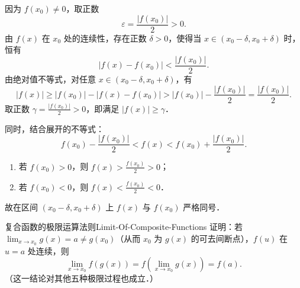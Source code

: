 \begin{myproof}
    因为 $f(x_0) \neq 0$，取正数
    \begin{equation}
        \varepsilon = \frac{|f(x_0)|}{2} > 0.
    \end{equation}
    由 $f(x)$ 在 $x_0$ 处的连续性，存在正数 $\delta > 0$，使得当 $x \in (x_0 - \delta, x_0 + \delta)$ 时，恒有
    \begin{equation}
        |f(x) - f(x_0)| < \frac{|f(x_0)|}{2}.
    \end{equation}
    由绝对值不等式，对任意 $x \in (x_0 - \delta, x_0 + \delta)$，有
    \begin{equation}
        |f(x)| \geqslant |f(x_0)| - |f(x) - f(x_0)| > |f(x_0)| - \frac{|f(x_0)|}{2} = \frac{|f(x_0)|}{2}.
    \end{equation}
    取正数 $\gamma = \frac{|f(x_0)|}{2} > 0$，即满足 $|f(x)| \geqslant \gamma$．

    同时，结合展开的不等式：
    \begin{equation}
        f(x_0) - \frac{|f(x_0)|}{2} < f(x) < f(x_0) + \frac{|f(x_0)|}{2}.
    \end{equation}
    \begin{enumerate}
        \item 若 $f(x_0) > 0$，则 $f(x) > \frac{f(x_0)}{2} > 0$；
        \item 若 $f(x_0) < 0$，则 $f(x) < \frac{f(x_0)}{2} < 0$．
    \end{enumerate}
    故在区间 $(x_0 - \delta, x_0 + \delta)$ 上 $f(x)$ 与 $f(x_0)$ 严格同号．
\end{myproof}

\begin{problem}{复合函数的极限运算法则}{Limit-Of-Composite-Functions}
    证明：若 $\lim_{x\to x_0} g(x) = a \neq g(x_0)$（从而 $x_0$ 为 $g(x)$ 的可去间断点），$f(u)$ 在 $u = a$ 处连续，则
    \begin{equation}
        \lim_{x\to x_0} f(g(x)) = f\left( \lim_{x\to x_0} g(x) \right) = f(a).
    \end{equation}
    （这一结论对其他五种极限过程也成立．）
\end{problem}

